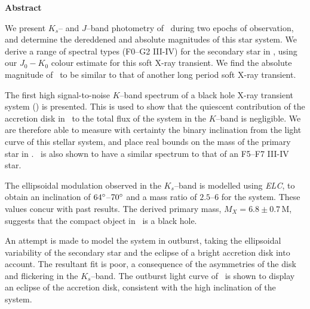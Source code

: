 
\begin{center}
\Large{\textbf{Abstract}}
\end{center}

\vspace{\myparskip}

We present $K_s$-- and $J$--band photometry of \groj\ during two epochs
of observation, and determine the dereddened and absolute magnitudes
of this star system. We derive a range of spectral types (F0--G2 III-IV) for the secondary star
in \groj, using our $J_{0}-K_{0}$ colour estimate for this soft X-ray transient. We find the absolute
magnitude of \groj\ to be similar to that of another long period soft
X-ray transient. %

\vspace{\myparskip}

The first high signal-to-noise $K$--band spectrum of a black hole X-ray
transient system (\groj) is presented. This is used to show that the quiescent contribution of the accretion disk in \groj\
to the total flux of the system in the $K$--band is negligible. We are
therefore able to measure with certainty the binary inclination from the light curve of this stellar system, and place real bounds on the mass of the primary star in \groj. \groj\ is also shown to have
a similar spectrum to that of an F5--F7 III-IV star. %

\vspace{\myparskip}

The ellipsoidal modulation observed in the $K_s$--band is modelled
using \textit{ELC}, to obtain an inclination of $64\hbox{$^\circ$}$--$70\hbox{$^\circ$}$ and a mass ratio of $2.5$--$6$ for the system. These values concur with past results. The derived primary mass, $M_X =
6.8\pm0.7$\,M\sun, suggests that the compact object in \groj\ is a black
hole. %

\vspace{\myparskip}

An attempt is made to model the system in outburst, taking the
ellipsoidal variability of the secondary star and the eclipse of a bright
accretion disk into account. The resultant fit is poor, a consequence
of the asymmetries of the disk and flickering in the $K_s$--band. The
outburst light curve of \groj\ is shown to display an eclipse of the
accretion disk, consistent with the high inclination of the system. %
